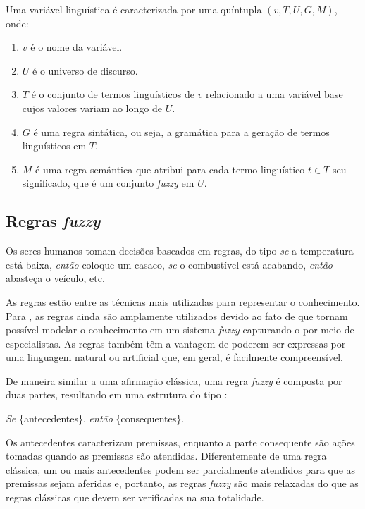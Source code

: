 \begin{defn}
\label{def:variavel_linguistica}
Uma variável linguística é caracterizada por uma quíntupla $(v, T, U, G, M)$, onde:

\begin{enumerate}[label=(\roman*)]
\item $v$ é o nome da variável.
\item $U$ é o universo de discurso.
\item $T$ é o conjunto de termos linguísticos de $v$ relacionado a uma variável base cujos valores variam ao longo de $U$.
\item $G$ é uma regra sintática, ou seja, a gramática para a geração de termos linguísticos em $T$.
\item $M$ é uma regra semântica que atribui para cada termo linguístico $t \in T$ seu significado, que é um conjunto \emph{fuzzy} em $U$.
\end{enumerate}
\end{defn}


\subsection{Regras \emph{fuzzy}}
\label{sec:regras_fuzzy}
Os seres humanos tomam decisões baseados em regras, do tipo \emph{se} a temperatura está baixa, \emph{então} coloque um casaco, \emph{se} o combustível está acabando, \emph{então} abasteça o veículo, etc.

As regras estão entre as técnicas mais utilizadas para representar o conhecimento. Para \citet{zimmermann:01}, as regras ainda são amplamente utilizados devido ao fato de que tornam possível modelar o conhecimento em um sistema \emph{fuzzy} capturando-o por meio de especialistas. As regras também têm a vantagem de poderem ser expressas por uma linguagem natural ou artificial que, em geral, é facilmente compreensível.

De maneira similar a uma afirmação clássica, uma regra \emph{fuzzy} é composta por duas partes, resultando em uma estrutura do tipo \citep{dubois:96}:
\begin{center}
\emph{Se} \{antecedentes\}, \emph{então} \{consequentes\}.
\end{center}

Os antecedentes caracterizam premissas, enquanto a parte consequente são ações tomadas quando as premissas são atendidas. Diferentemente de uma regra clássica, um ou mais antecedentes podem ser parcialmente atendidos para que as premissas sejam aferidas e, portanto, as regras \emph{fuzzy} são mais relaxadas do que as regras clássicas que devem ser verificadas na sua totalidade.

